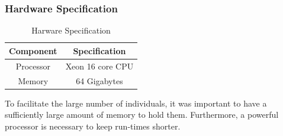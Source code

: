 \documentclass[a4paper,12pt]{article}
\begin{document}
            \subsubsection*{Hardware Specification}
                \par{
                    \begin{table}[h!]
                        \centering
                            \small 
                            \begin{tabular}{ | c | c | } 
                                \hline
                                \textbf{Component} & \textbf{Specification} \\
                                \hline  
                                Processor & Xeon 16 core CPU \\ 
                                Memory & 64 Gigabytes\\  
                                \hline 
                            \end{tabular}
                            \caption{Harware Specification} 
                    \end{table}
                    \noindent To facilitate the large number of individuals, it was important to have a sufficiently large amount of memory to 
                    hold them. Furthermore, a powerful processor is necessary to keep run-times shorter. 
                }
\end{document}
